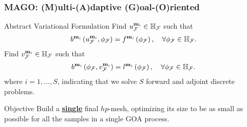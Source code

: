 \begin{frame}
\frametitle{MAGO: (M)ulti-(A)daptive (G)oal-(O)riented}
    \begin{block}{Abstract Variational Formulation}
        Find \( u^{\mathbf{m}_i}_{\mathcal{F}} \in \mathbb{H}_{\mathcal{F}} \) such that
        \begin{align}
		b^{\mathbf{m}_i}\left(u^{\mathbf{m}_i}_{\mathcal{F}},\phi_{\mathcal{F}}\right) = f^{\mathbf{m}_i}\left(\phi_{\mathcal{F}}\right), \quad \forall \phi_{\mathcal{F}} \in \mathbb{H}_{\mathcal{F}}.
        \end{align}
        \vspace{1em} %
        Find \( v^{\mathbf{m}_i}_{\mathcal{F}} \in \mathbb{H}_{\mathcal{F}} \) such that
        \begin{align}
           b^{\mathbf{m}_i}\left(\phi_{\mathcal{F}},v^{\mathbf{m}_i}_{\mathcal{F}}\right) = l^{\mathbf{m}_i}\left(\phi_{\mathcal{F}}\right), \quad \forall \phi_{\mathcal{F}} \in \mathbb{H}_{\mathcal{F}}.
        \end{align}
        where \( i = 1, \ldots, S \), indicating that we solve \( S \) forward and adjoint discrete problems.
    \end{block}    
    \begin{block}{Objective}
          Build a \underline{\textbf{single}} final \( hp \)-mesh, optimizing its size to be as small as possible for all the samples in a single GOA process.
	\end{block} 
\end{frame}
%

